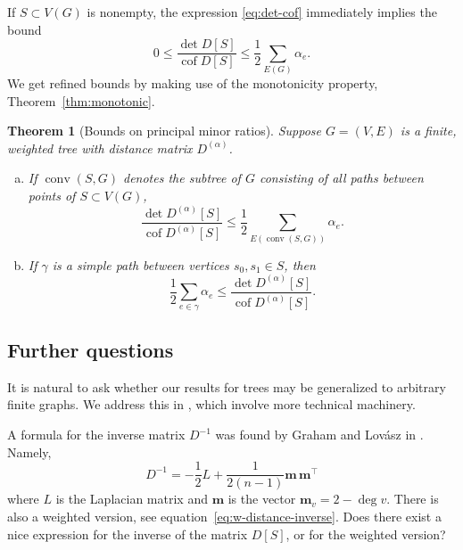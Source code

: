 \documentclass{amsart}
\newtheorem{thm}{Theorem}[section]
\newtheorem{cor}[thm]{Corollary}
\theoremstyle{definition}
\newcommand{\boldm}{\mathbf{m}}
\newcommand{\Da}{{D^{(\alpha)}}}
\newcommand{\tr}{\intercal}
\DeclareMathOperator{\cof}{cof}
\DeclareMathOperator{\conv}{conv}
\begin{document}
If $S \subset V(G)$ is nonempty,
the expression \eqref{eq:det-cof} immediately implies the bound
\begin{equation*}
0 \leq \frac{\det D[S]}{\cof D[S]} \leq \frac12 \sum_{E(G)} \alpha_e .
\end{equation*}
We get refined bounds by making use of the monotonicity property, Theorem~\ref{thm:monotonic}.

\begin{thm}[Bounds on principal minor ratios]
\label{thm:det-cof-bounds}
Suppose $G = (V,E)$ is a finite, weighted tree with distance matrix $\Da$.
\begin{enumerate}[(a)]
\item 
If $\conv(S,G)$ denotes the subtree of $G$ consisting of all paths between points of $S \subset V(G)$,
\begin{equation*}
 \frac{\det \Da[S]}{\cof \Da[S]} \leq \frac12 \sum_{E(\conv(S, G))} \alpha_e .
\end{equation*}

\item 
If $\gamma$ is a simple path between vertices $s_0, s_1 \in S$, then
\begin{equation*}
	\frac12 \sum_{e \in \gamma} \alpha_e \leq \frac{\det \Da[S]}{\cof \Da[S]}.
\end{equation*}
\end{enumerate}
\end{thm}


\subsection{Further questions} 

It is natural to ask whether our results for trees may be generalized to arbitrary finite graphs.
We address this in \cite{richman-shokrieh-wu}, which involve more technical machinery.


A formula for the inverse matrix $D^{-1}$ was found by Graham and Lov\'{a}sz in \cite{graham-lovasz}.
Namely,
\[
	D^{-1} = - \frac12 L + \frac1{2(n - 1)} \boldm \,\boldm^\tr
\]
where $L$ is the Laplacian matrix and $\boldm$ is the vector $\boldm_v = 2 - \deg v$.
There is also a weighted version, see equation~\eqref{eq:w-distance-inverse}.
Does there exist a nice expression for the inverse of the matrix $D[S]$, or for the weighted version?
\end{document}
